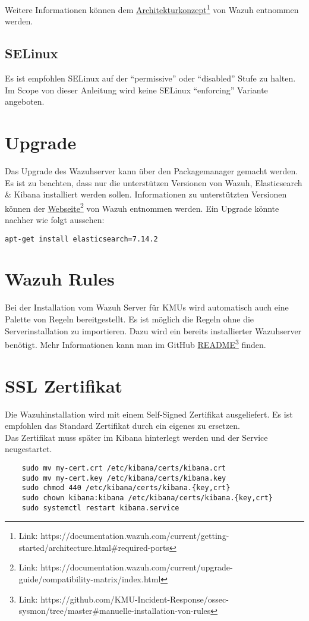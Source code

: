 Weitere Informationen können dem \href{https://documentation.wazuh.com/current/getting-started/architecture.html\#required-ports}{Architekturkonzept}\footnote{Link: https://documentation.wazuh.com/current/getting-started/architecture.html\#required-ports} von Wazuh entnommen werden.\\


\subsection{SELinux}
Es ist empfohlen SELinux auf der ``permissive'' oder ``disabled'' Stufe zu halten. Im Scope von dieser Anleitung wird keine SELinux ``enforcing'' Variante angeboten.

\section{Upgrade}
Das Upgrade des Wazuhserver kann über den Packagemanager gemacht werden.
Es ist zu beachten, dass nur die unterstützen Versionen von Wazuh, Elasticsearch \& Kibana installiert werden sollen.
Informationen zu unterstützten Versionen können der \href{https://documentation.wazuh.com/current/upgrade-guide/compatibility-matrix/index.html}{Webseite}\footnote{Link: https://documentation.wazuh.com/current/upgrade-guide/compatibility-matrix/index.html} von Wazuh entnommen werden. Ein Upgrade könnte nachher wie folgt aussehen:
\begin{lstlisting}
apt-get install elasticsearch=7.14.2
\end{lstlisting}


\section{Wazuh Rules}
Bei der Installation vom Wazuh Server für KMUs wird automatisch auch eine Palette von Regeln bereitgestellt.
Es ist möglich die Regeln ohne die Serverinstallation zu importieren.
Dazu wird ein bereits installierter Wazuhserver benötigt.
Mehr Informationen kann man im GitHub \href{https://github.com/KMU-Incident-Response/ossec-sysmon/tree/master\#manuelle-installation-von-rules}{README}\footnote{Link: https://github.com/KMU-Incident-Response/ossec-sysmon/tree/master\#manuelle-installation-von-rules} finden.

\section{SSL Zertifikat}
Die Wazuhinstallation wird mit einem Self-Signed Zertifikat ausgeliefert.
Es ist empfohlen das Standard Zertifikat durch ein eigenes zu ersetzen.\\

Das Zertifikat muss später im Kibana hinterlegt werden und der Service neugestartet.

\begin{lstlisting}
    sudo mv my-cert.crt /etc/kibana/certs/kibana.crt
    sudo mv my-cert.key /etc/kibana/certs/kibana.key
    sudo chmod 440 /etc/kibana/certs/kibana.{key,crt}
    sudo chown kibana:kibana /etc/kibana/certs/kibana.{key,crt}
    sudo systemctl restart kibana.service
\end{lstlisting}